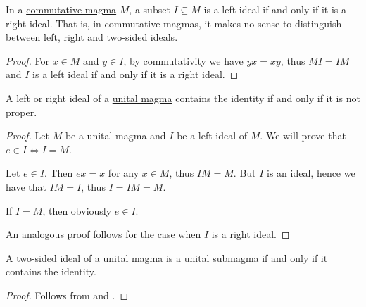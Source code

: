 \begin{proposition}\label{thm:commutative_magma_ideals}
  In a \hyperref[def:magma/commutative]{commutative magma} \( M \), a subset \( I \subseteq M \) is a left ideal if and only if it is a right ideal. That is, in commutative magmas, it makes no sense to distinguish between left, right and two-sided ideals.
\end{proposition}
\begin{proof}
  For \( x \in M \) and \( y \in I \), by commutativity we have \( yx = xy \), thus \( M I = I M \) and \( I \) is a left ideal if and only if it is a right ideal.
\end{proof}

\begin{proposition}\label{thm:proper_ideals_containing_identity}
  A left or right ideal of a \hyperref[def:unital_magma]{unital magma} contains the identity if and only if it is not proper.
\end{proposition}
\begin{proof}
  Let \( M \) be a unital magma and \( I \) be a left ideal of \( M \). We will prove that \( e \in I \iff I = M \).

  \SufficiencySubProof Let \( e \in I \). Then \( ex = x \) for any \( x \in M \), thus \( IM = M \). But \( I \) is an ideal, hence we have that \( IM = I \), thus \( I = IM = M \).

  \NecessitySubProof If \( I = M \), then obviously \( e \in I \).

  An analogous proof follows for the case when \( I \) is a right ideal.
\end{proof}

\begin{corollary}\label{thm:unital_magma_ideal_is_submagma_iff_contains_identity}
  A two-sided ideal of a unital magma is a unital submagma if and only if it contains the identity.
\end{corollary}
\begin{proof}
  Follows from  and .
\end{proof}

